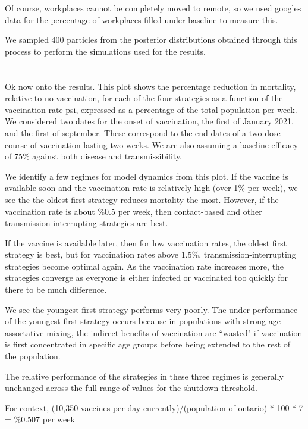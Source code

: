 \documentclass{article}
\begin{document}
Of course, workplaces cannot be completely moved to remote, so we used googles data for the percentage of workplaces filled under baseline to measure this.

We sampled 400 particles from the posterior distributions obtained through this process to perform the simulations used for the results.  

\section{}


Ok now onto the results. This plot shows the percentage reduction in mortality, relative to no vaccination, for each of the four strategies as a function of the vaccination rate psi, expressed as a percentage of the total population per week. We considered two dates for the onset of vaccination, the first of January 2021, and the first of september. These correspond to the end dates of a two-dose course of vaccination lasting two weeks. We are also assuming a baseline efficacy of 75\% against both disease and transmissibility.

We identify a few regimes for model dynamics from this plot. If the vaccine is available soon and the vaccination rate is relatively high (over 1\% per week), we see the the oldest first strategy reduces mortality the most. However, if the vaccination rate is about \%0.5 per week, then contact-based and other transmission-interrupting strategies are best.

If the vaccine is available later, then for low vaccination rates, the oldest first strategy is best, but for vaccination rates above 1.5\%, transmission-interrupting strategies become optimal again. As the vaccination rate increases more, the strategies converge as everyone is either infected or vaccinated too quickly for there to be much difference.

We see the youngest first strategy performs very poorly. The under-performance of the youngest first strategy occurs because in populations with strong age-assortative mixing, the indirect benefits of vaccination are “wasted" if vaccination is first concentrated in specific age groups before being extended to the rest of the population.

The relative performance of the strategies in these three regimes is generally unchanged across the full range of values for the shutdown threshold.

For context, 
(10,350 vaccines per day currently)/(population of ontario) * 100 * 7 = \%0.507 per week 
\end{document}
